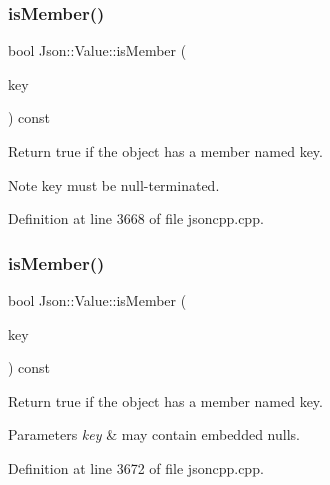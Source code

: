 \hypertarget{class_json_1_1_value_ad6d4df2227321bab05e86667609a7fad}{}\label{class_json_1_1_value_ad6d4df2227321bab05e86667609a7fad} 
\subsubsection{\texorpdfstring{is\+Member()}{isMember()}\hspace{0.1cm}{\footnotesize\ttfamily [4/6]}}
{\footnotesize\ttfamily bool Json\+::\+Value\+::is\+Member (\begin{DoxyParamCaption}\item[{const char $\ast$}]{key }\end{DoxyParamCaption}) const}

Return true if the object has a member named key. \begin{DoxyNote}{Note}
\textquotesingle{}key\textquotesingle{} must be null-\/terminated. 
\end{DoxyNote}


Definition at line 3668 of file jsoncpp.\+cpp.

\hypertarget{class_json_1_1_value_a0c2cd838217b23ee6bde8135de1b30d9}{}\label{class_json_1_1_value_a0c2cd838217b23ee6bde8135de1b30d9} 
\subsubsection{\texorpdfstring{is\+Member()}{isMember()}\hspace{0.1cm}{\footnotesize\ttfamily [5/6]}}
{\footnotesize\ttfamily bool Json\+::\+Value\+::is\+Member (\begin{DoxyParamCaption}\item[{const \hyperlink{config_8h_a1e723f95759de062585bc4a8fd3fa4be}{J\+S\+O\+N\+C\+P\+P\+\_\+\+S\+T\+R\+I\+NG} \&}]{key }\end{DoxyParamCaption}) const}

Return true if the object has a member named key. 
\begin{DoxyParams}{Parameters}
{\em key} & may contain embedded nulls. \\
\hline
\end{DoxyParams}


Definition at line 3672 of file jsoncpp.\+cpp.

